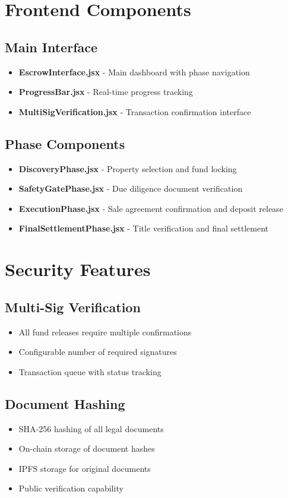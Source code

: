 \documentclass[12pt,a4paper]{article}
\begin{document}
\section{Frontend Components}

\subsection{Main Interface}
\begin{itemize}
\item \textbf{EscrowInterface.jsx} - Main dashboard with phase navigation
\item \textbf{ProgressBar.jsx} - Real-time progress tracking
\item \textbf{MultiSigVerification.jsx} - Transaction confirmation interface
\end{itemize}

\subsection{Phase Components}
\begin{itemize}
\item \textbf{DiscoveryPhase.jsx} - Property selection and fund locking
\item \textbf{SafetyGatePhase.jsx} - Due diligence document verification
\item \textbf{ExecutionPhase.jsx} - Sale agreement confirmation and deposit release
\item \textbf{FinalSettlementPhase.jsx} - Title verification and final settlement
\end{itemize}

\section{Security Features}

\subsection{Multi-Sig Verification}
\begin{itemize}
\item All fund releases require multiple confirmations
\item Configurable number of required signatures
\item Transaction queue with status tracking
\end{itemize}

\subsection{Document Hashing}
\begin{itemize}
\item SHA-256 hashing of all legal documents
\item On-chain storage of document hashes
\item IPFS storage for original documents
\item Public verification capability
\end{itemize}
\end{document}
